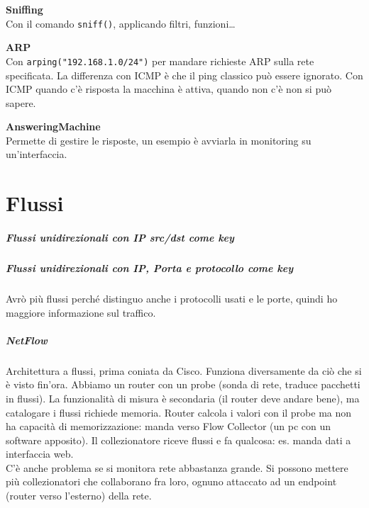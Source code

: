 \documentclass[10pt]{book}
\begin{document}
\begin{list}{}{}
	\item \textbf{Sniffing}\\
	Con il comando \texttt{sniff()}, applicando filtri, funzioni\ldots\\
	\item \textbf{ARP}\\
	Con \texttt{arping("192.168.1.0/24")} per mandare richieste ARP sulla rete specificata. La differenza con ICMP è che il ping classico può essere ignorato. Con ICMP quando c'è risposta la macchina è attiva, quando non c'è non si può sapere.
	\item \textbf{AnsweringMachine}\\
	Permette di gestire le risposte, un esempio è avviarla in monitoring su un'interfaccia. 
\end{list}
\chapter{Flussi}
\paragraph{Flussi unidirezionali con IP src/dst come key}
\paragraph{Flussi unidirezionali con IP, Porta e protocollo come key} Avrò più flussi perché distinguo anche i protocolli usati e le porte, quindi ho maggiore informazione sul traffico.
\paragraph{NetFlow} Architettura a flussi, prima coniata da Cisco. Funziona diversamente da ciò che si è visto fin'ora. Abbiamo un router con un probe (sonda di rete, traduce pacchetti in flussi). La funzionalità di misura è secondaria (il router deve andare bene), ma catalogare i flussi richiede memoria. Router calcola i valori con il probe ma non ha capacità di memorizzazione: manda verso Flow Collector (un pc con un software apposito). Il collezionatore riceve flussi e fa qualcosa: es. manda dati a interfaccia web.\\
C'è anche problema se si monitora rete abbastanza grande. Si possono mettere più collezionatori che collaborano fra loro, ognuno attaccato ad un endpoint (router verso l'esterno) della rete.
\end{document}

